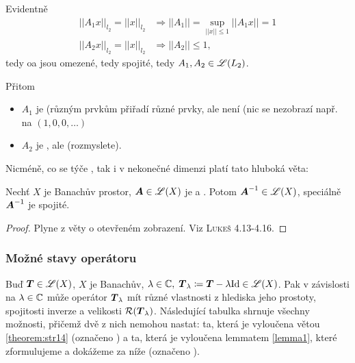 Evidentně
\begin{equation*}
\begin{split}
  ||A_1x||_{l_2}=||x||_{l_2}&\Rightarrow ||A_1||=\sup\limits_{||x||\leq1}||A_1 x||=1\\
  ||A_2x||_{l_2}=||x||_{l_2}&\Rightarrow ||A_2||\leq1,
\end{split}
\end{equation*}
tedy oa jsou omezené, tedy spojité, tedy $A_1,A_2\in \mathscr{L}(L_2)$.

Přitom \begin{itemize}
    \item $A_1$ je  (různým prvkům přiřadí různé prvky, ale není  (nic se nezobrazí např. na $(1,0,0,\dots)$
    \item $A_2$ je , ale  (rozmyslete).
\end{itemize}

Nicméně, co se týče , tak i v nekonečné dimenzi platí tato hluboká věta:
\begin{theorem}
\label{theorem:str23}
Nechť $X$ je Banachův prostor, $\boldsymbol{A}\in \mathscr{L} (X)$ je  a . Potom $\boldsymbol{A}^{-1}\in \mathscr{L} (X)$, speciálně  $\boldsymbol{A}^{-1}$ je spojité.
\end{theorem}

\begin{proof}
Plyne z věty o otevřeném zobrazení. Viz \textsc{Lukeš 4.13-4.16}.
\end{proof}

    
\subsubsection{Možné stavy operátoru}
Buď $ \boldsymbol{T} \in\mathscr{L}(X)$, $X$ je Banachův, $\lambda\in\mathbb{C},\;  \boldsymbol{T}_\lambda\coloneqq  \boldsymbol{T} -\lambda\mathrm{Id} \in\mathscr{L}(X)$. Pak v závislosti na $\lambda\in\mathbb{C}$ může operátor $ \boldsymbol{T}_\lambda$ mít různé vlastnosti z hlediska jeho prostoty, spojitosti inverze a velikosti $\mathcal{R}( \boldsymbol{T}_\lambda)$. Následující tabulka shrnuje všechny možnosti, přičemž dvě z nich nemohou nastat: ta, která je vyloučena větou \ref{theorem:str14} (označeno ) a ta, která je vyloučena lemmatem \ref{lemma1}, které zformulujeme a dokážeme za níže (označeno ).

